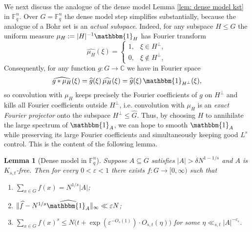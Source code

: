 \documentclass[A4paper,reqno,oneside,12pt]{amsart}
\theoremstyle{plain}
\newtheorem{lemma}[theorem]{Lemma}
\theoremstyle{definition}
\newcommand{\e}{\mathbbm{1}}          %
\newcommand{\C}{\mathbb{C}}
\newcommand{\F}{\mathbb{F}}
\begin{document}
We next discuss the analogue of the dense model Lemma \ref{lem: dense model kst} in $\mathbb{F}_{q}^{n}$.
Over $G=\F_q^n$ the dense model step simplifies substantially, because the analogue of a Bohr set is an
\emph{actual subspace}.  Indeed, for any
subspace $H\le G$ the uniform measure $\mu_H:=|H|^{-1}\e_H$ has Fourier transform
\[
\widehat{\mu_H}(\xi)=
\begin{cases}
1,& \xi\in H^\perp,\\
0,& \xi\notin H^\perp,
\end{cases}
\]
Consequently, for any function $g:G\to\C$ we have in Fourier space
\[
\widehat{g*\mu_H}(\xi)=\widehat g(\xi)\,\widehat{\mu_H}(\xi)
=\widehat g(\xi)\,\e_{H^\perp}(\xi),
\]
so convolution with $\mu_H$ keeps precisely the Fourier coefficients of $g$ on $H^\perp$ and kills all Fourier coefficients outside $H^\perp$, i.e. convolution with $\mu_H$ is an \emph{exact Fourier projector} onto the subspace $H^\perp\le \widehat G$.
Thus, by choosing $H$ to annihilate the large spectrum of $\e_A$, we can hope to smooth $\e_A$ while
preserving its large Fourier coefficients and simultaneously keeping good $L^s$ control. This is the content of the following lemma. 

\begin{lemma}[Dense model in $\F_q^n$]\label{lem:dense-model-ff}
Suppose $A\subseteq G$ satisfies $|A|>\delta N^{1-1/s}$ and $A$ is $K_{s,t}$-free. 
Then for every $0<\varepsilon<1$ there exists $f:G\to[0,\infty)$ such that
\begin{enumerate}[label=(\roman*)]
\item $\sum_{x\in G} f(x)=N^{1/s}|A|$;
\item $\|\widehat f-N^{1/s}\widehat{\e_A}\|_\infty\ll \varepsilon N$;
\item $\displaystyle \sum_{x\in G} f(x)^s\le N\Big(t+\exp(\varepsilon^{-O_s(1)})\cdot O_{s,t}(\eta)\Big)$ for some $\eta\ll_{s,t}|A|^{-c_s}$.
\end{enumerate}
\end{lemma}
\end{document}
